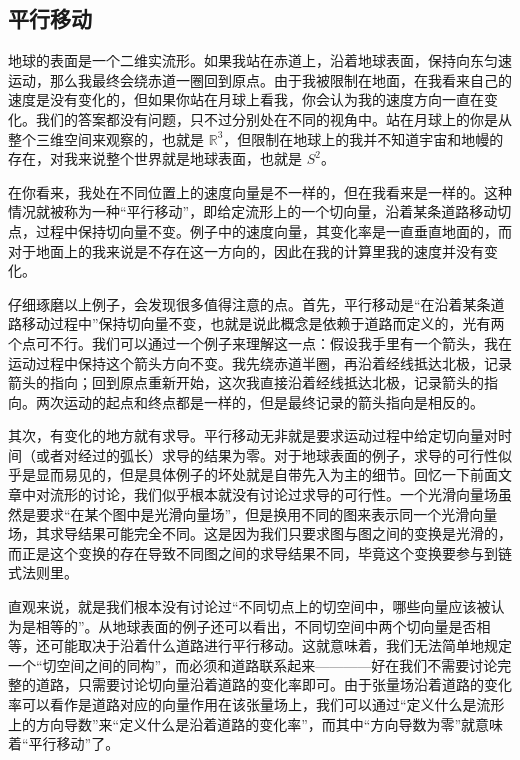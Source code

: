 


\subsection{平行移动}

地球的表面是一个二维实流形。如果我站在赤道上，沿着地球表面，保持向东匀速运动，那么我最终会绕赤道一圈回到原点。由于我被限制在地面，在我看来自己的速度是没有变化的，但如果你站在月球上看我，你会认为我的速度方向一直在变化。我们的答案都没有问题，只不过分别处在不同的视角中。站在月球上的你是从整个三维空间来观察的，也就是 $\mathbb{R}^3$，但限制在地球上的我并不知道宇宙和地幔的存在，对我来说整个世界就是地球表面，也就是 $S^2$。

在你看来，我处在不同位置上的速度向量是不一样的，但在我看来是一样的。这种情况就被称为一种“平行移动”，即给定流形上的一个切向量，沿着某条道路移动切点，过程中保持切向量不变。例子中的速度向量，其变化率是一直垂直地面的，而对于地面上的我来说是不存在这一方向的，因此在我的计算里我的速度并没有变化。

仔细琢磨以上例子，会发现很多值得注意的点。首先，平行移动是“在沿着某条道路移动过程中”保持切向量不变，也就是说此概念是依赖于道路而定义的，光有两个点可不行。我们可以通过一个例子来理解这一点：假设我手里有一个箭头，我在运动过程中保持这个箭头方向不变。我先绕赤道半圈，再沿着经线抵达北极，记录箭头的指向；回到原点重新开始，这次我直接沿着经线抵达北极，记录箭头的指向。两次运动的起点和终点都是一样的，但是最终记录的箭头指向是相反的。

其次，有变化的地方就有求导。平行移动无非就是要求运动过程中给定切向量对时间（或者对经过的弧长）求导的结果为零。对于地球表面的例子，求导的可行性似乎是显而易见的，但是具体例子的坏处就是自带先入为主的细节。回忆一下前面文章中对流形的讨论，我们似乎根本就没有讨论过求导的可行性。一个光滑向量场虽然是要求“在某个图中是光滑向量场”，但是换用不同的图来表示同一个光滑向量场，其求导结果可能完全不同。这是因为我们只要求图与图之间的变换是光滑的，而正是这个变换的存在导致不同图之间的求导结果不同，毕竟这个变换要参与到链式法则里。

直观来说，就是我们根本没有讨论过“不同切点上的切空间中，哪些向量应该被认为是相等的”。从地球表面的例子还可以看出，不同切空间中两个切向量是否相等，还可能取决于沿着什么道路进行平行移动。这就意味着，我们无法简单地规定一个“切空间之间的同构”，而必须和道路联系起来————好在我们不需要讨论完整的道路，只需要讨论切向量沿着道路的变化率即可。由于张量场沿着道路的变化率可以看作是道路对应的向量作用在该张量场上，我们可以通过“定义什么是流形上的方向导数”来“定义什么是沿着道路的变化率”，而其中“方向导数为零”就意味着“平行移动”了。

